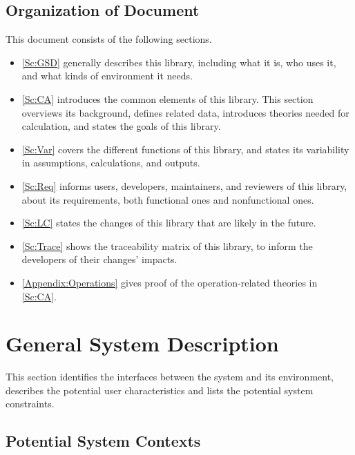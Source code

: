\documentclass[12pt]{article}
\begin{document}
\subsection{Organization of Document}
This document consists of the following sections.
\begin{itemize}
	\item \autoref{Sc:GSD} generally describes this library, including what it is, who uses it, and what kinds of environment it needs.
	\item \autoref{Sc:CA} introduces the common elements of this library. This section overviews its background, defines related data, introduces theories needed for calculation, and states the goals of this library.
	\item \autoref{Sc:Var} covers the different functions of this library, and states its variability in assumptions, calculations, and outputs.
	\item \autoref{Sc:Req} informs users, developers, maintainers, and reviewers of this library, about its requirements, both functional ones and nonfunctional ones.
	\item \autoref{Sc:LC} states the changes of this library that are likely in the future.
	\item \autoref{Sc:Trace} shows the traceability matrix of this library, to inform the developers of their changes' impacts.
	\item \autoref{Appendix:Operations} gives proof of the operation-related theories in \autoref{Sc:CA}.
\end{itemize}

\section{General System Description}\label{Sc:GSD}

This section identifies the interfaces between the system and its environment,
describes the potential user characteristics and lists the potential system
constraints.

\subsection{Potential System Contexts}
\end{document}
